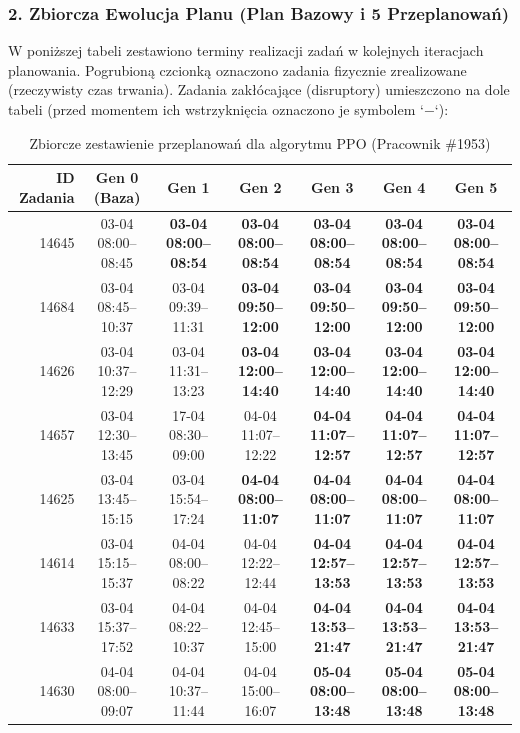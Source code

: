 \subsubsection*{2. Zbiorcza Ewolucja Planu (Plan Bazowy i 5 Przeplanowań)}

W poniższej tabeli zestawiono terminy realizacji zadań w kolejnych iteracjach planowania. Pogrubioną czcionką oznaczono zadania fizycznie zrealizowane (rzeczywisty czas trwania). Zadania zakłócające (disruptory) umieszczono na dole tabeli (przed momentem ich wstrzyknięcia oznaczono je symbolem `$-$`):

\begin{table}[htbp]
\centering\scriptsize
\caption{Zbiorcze zestawienie przeplanowań dla algorytmu PPO (Pracownik \#1953)}
\label{tab:case_study_evolution_ppo_u1953}
\begin{tabular}{|r|c|c|c|c|c|c|}
\hline
\textbf{ID Zadania} & \textbf{Gen 0 (Baza)} & \textbf{Gen 1} & \textbf{Gen 2} & \textbf{Gen 3} & \textbf{Gen 4} & \textbf{Gen 5} \\ \hline
14645 & 03-04 08:00--08:45 & \textbf{03-04 08:00--08:54} & \textbf{03-04 08:00--08:54} & \textbf{03-04 08:00--08:54} & \textbf{03-04 08:00--08:54} & \textbf{03-04 08:00--08:54} \\ 
14684 & 03-04 08:45--10:37 & 03-04 09:39--11:31 & \textbf{03-04 09:50--12:00} & \textbf{03-04 09:50--12:00} & \textbf{03-04 09:50--12:00} & \textbf{03-04 09:50--12:00} \\ 
14626 & 03-04 10:37--12:29 & 03-04 11:31--13:23 & \textbf{03-04 12:00--14:40} & \textbf{03-04 12:00--14:40} & \textbf{03-04 12:00--14:40} & \textbf{03-04 12:00--14:40} \\ 
14657 & 03-04 12:30--13:45 & 17-04 08:30--09:00 & 04-04 11:07--12:22 & \textbf{04-04 11:07--12:57} & \textbf{04-04 11:07--12:57} & \textbf{04-04 11:07--12:57} \\ 
14625 & 03-04 13:45--15:15 & 03-04 15:54--17:24 & \textbf{04-04 08:00--11:07} & \textbf{04-04 08:00--11:07} & \textbf{04-04 08:00--11:07} & \textbf{04-04 08:00--11:07} \\ 
14614 & 03-04 15:15--15:37 & 04-04 08:00--08:22 & 04-04 12:22--12:44 & \textbf{04-04 12:57--13:53} & \textbf{04-04 12:57--13:53} & \textbf{04-04 12:57--13:53} \\ 
14633 & 03-04 15:37--17:52 & 04-04 08:22--10:37 & 04-04 12:45--15:00 & \textbf{04-04 13:53--21:47} & \textbf{04-04 13:53--21:47} & \textbf{04-04 13:53--21:47} \\ 
14630 & 04-04 08:00--09:07 & 04-04 10:37--11:44 & 04-04 15:00--16:07 & \textbf{05-04 08:00--13:48} & \textbf{05-04 08:00--13:48} & \textbf{05-04 08:00--13:48} \\ 

\end{tabular}
\end{table}
